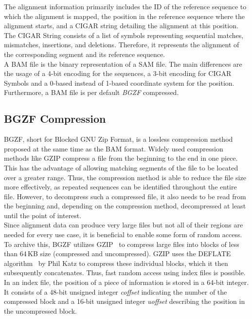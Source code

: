 The alignment information primarily includes the ID of the reference sequence to which the alignment is mapped, the position in the reference sequence where the alignment starts, and a CIGAR string detailing the alignment at this position. The CIGAR String consists of a list of symbols representing sequential matches, mismatches, insertions, and deletions. Therefore, it represents the alignment of the corresponding segment and its reference sequence. \\

A BAM file is the binary representation of a SAM file. The main differences are the usage of a 4-bit encoding for the sequences, a 3-bit encoding for CIGAR Symbols and a 0-based instead of 1-based coordinate system for the position. Furthermore, a BAM file is per default \textit{BGZF} compressed.

\subsection{BGZF Compression}
BGZF, short for Blocked GNU Zip Format, is a lossless compression method proposed at the same time as the BAM format. Widely used compression methods like GZIP compress a file from the beginning to the end in one piece. This has the advantage of allowing matching segments of the file to be located over a greater range. Thus, the compression method is able to reduce the file size more effectively, as repeated sequences can be identified throughout the entire file. However, to decompress such a compressed file, it also needs to be read from the beginning and, depending on the compression method, decompressed at least until the point of interest. \\

Since alignment data can produce very large files but not all of their regions are needed for every use case, it is beneficial to enable some form of random access. To archive this, BGZF utilizes GZIP~\cite{gzip} to compress large files into blocks of less than 64\,KB size (compressed and uncompressed). GZIP uses the DEFLATE algorithm~\cite{deflate} by Phil Katz to compress these individual blocks, which it then subsequently concatenates. Thus, fast random access using index files is possible. In an index file, the position of a piece of information is stored in a 64-bit integer. It consists of a 48-bit unsigned integer \textit{coffset} indicating the number of the compressed block and a 16-bit unsigned integer \textit{uoffset} describing the position in the uncompressed block. \\

